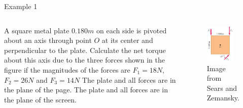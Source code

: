 \documentclass[]{beamer}
\begin{document}

\begin{frame}

Example 1
  \vspace{7mm}

  \begin{columns}[c]
    \column{2in}  %
   

A square metal plate $0.180 m$ on each side is pivoted
about an axis through point $O$ at its center and perpendicular to the
plate. Calculate the net torque about this axis due to
the three forces shown in the figure if the magnitudes of the forces
are $F_1=18N$, $F_2=26N$  and $F_3=14N$  The plate and
all forces are in the plane of the page. The plate and
all forces are in the plane of the screen.


    \column{2in}
 

    \begin{figure}[h!]  
      \includegraphics[width=0.8\textwidth]{images/16.jpg}
      \caption{Image from Sears and Zemansky.}
    \end{figure}

    

    \end{columns}





  \end{frame}
\end{document}
